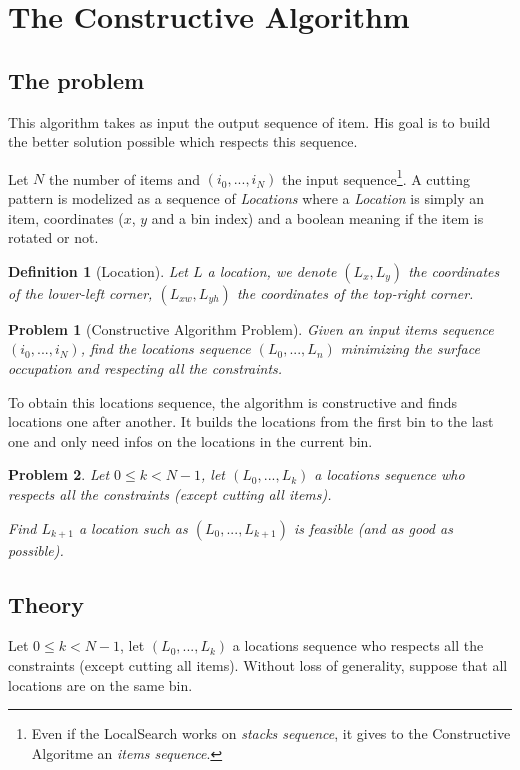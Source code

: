 \documentclass{article}
\newtheorem{problem}{Problem}
\newtheorem{definition}{Definition}
\begin{document}
\section{The Constructive Algorithm}

    \subsection{The problem}
This algorithm takes as input the output sequence of item. His goal is to build the better solution possible which respects this sequence.

Let $N$ the number of items and $(i_0, ..., i_N)$ the input sequence\footnote{Even if the LocalSearch works on \textit{stacks sequence}, it gives to the Constructive Algoritme an \textit{items sequence}.}. 
A cutting pattern is modelized as a sequence of \textit{Locations} where a \textit{Location} is simply an item, coordinates ($x$, $y$ and a bin index) and a boolean meaning if the item is rotated or not.

\begin{definition}[Location]
Let $L$ a location, we denote $(L_x, L_y)$ the coordinates of the lower-left corner, $(L_{xw}, L_{yh})$ the coordinates of the top-right corner.
\end{definition}

\begin{problem}[Constructive Algorithm Problem]
Given an input items sequence $(i_0, ..., i_N)$, find the locations sequence $(L_0, ..., L_n)$ minimizing the surface occupation and respecting all the constraints.
\end{problem}

To obtain this locations sequence, the algorithm is constructive and finds locations one after another. It builds the locations from the first bin to the last one and only need infos on the locations in the current bin.

\begin{problem}
Let $0 \leq k  < N - 1$, let $(L_0, ..., L_k)$ a locations sequence who respects all the constraints (except cutting all items).

Find $L_{k + 1}$ a location such as $(L_0, ..., L_{k + 1})$ is feasible (and as good as possible).
\end{problem}

    \subsection{Theory}
    Let $0 \leq k  < N - 1$, let $(L_0, ..., L_k)$ a locations sequence who respects all the constraints (except cutting all items). Without loss of  generality, suppose that all locations are on the same bin.
\end{document}

